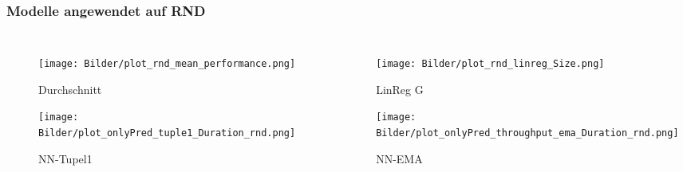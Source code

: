 \documentclass{beamer}
\begin{document}
\begin{frame}
	\frametitle{Modelle angewendet auf RND}
	\begin{columns}
		\begin{figure}
			\texttt{[image: Bilder/plot\_rnd\_mean\_performance.png]}\\
			\vspace*{-0.45cm}
			\caption{Durchschnitt}
			\texttt{[image: Bilder/plot\_onlyPred\_tuple1\_Duration\_rnd.png]}
			\vspace*{-0.45cm}
			\caption{NN-Tupel1}
		\end{figure}
		\begin{figure}
			\texttt{[image: Bilder/plot\_rnd\_linreg\_Size.png]}\\
			\vspace*{-0.45cm}
			\caption{LinReg G}
			\texttt{[image: Bilder/plot\_onlyPred\_throughput\_ema\_Duration\_rnd.png]}
			\vspace*{-0.45cm}
			\caption{NN-EMA}
		\end{figure}
	\end{columns}
\end{frame}

\end{document}
